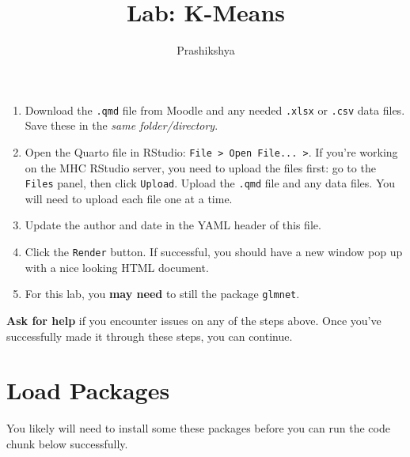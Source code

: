 \documentclass[
  letterpaper,
  DIV=11,
  numbers=noendperiod]{scrartcl}
\title{Lab: K-Means}
\author{Prashikshya}
\date{}
\begin{document}
\maketitle


\begin{tcolorbox}[enhanced jigsaw, titlerule=0mm, colbacktitle=quarto-callout-tip-color!10!white, arc=.35mm, toptitle=1mm, breakable, left=2mm, opacityback=0, title=\textcolor{quarto-callout-tip-color}{\faLightbulb}\hspace{0.5em}{Getting Started}, colback=white, coltitle=black, bottomrule=.15mm, colframe=quarto-callout-tip-color-frame, bottomtitle=1mm, opacitybacktitle=0.6, rightrule=.15mm, toprule=.15mm, leftrule=.75mm]

\begin{enumerate}
\def\labelenumi{\arabic{enumi}.}
\item
  Download the \texttt{.qmd} file from Moodle and any needed
  \texttt{.xlsx} or \texttt{.csv} data files. Save these in the
  \emph{same folder/directory}.
\item
  Open the Quarto file in RStudio:
  \texttt{File\ \textgreater{}\ Open\ File...\ \textgreater{}}. If
  you're working on the MHC RStudio server, you need to upload the files
  first: go to the \texttt{Files} panel, then click \texttt{Upload}.
  Upload the \texttt{.qmd} file and any data files. You will need to
  upload each file one at a time.
\item
  Update the author and date in the YAML header of this file.
\item
  Click the \texttt{Render} button. If successful, you should have a new
  window pop up with a nice looking HTML document.
\item
  For this lab, you \textbf{may need} to still the package
  \texttt{glmnet}.
\end{enumerate}

\textbf{Ask for help} if you encounter issues on any of the steps above.
Once you've successfully made it through these steps, you can continue.

\end{tcolorbox}

\section{Load Packages}\label{load-packages}

You likely will need to install some these packages before you can run
the code chunk below successfully.
\end{document}
